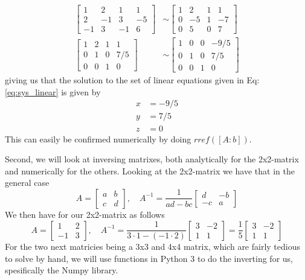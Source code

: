 \documentclass[10pt, a4paper]{amsart}
\begin{document}
\begin{align}
 \left[
 \begin{array}{ccc|c}
 1 & 2 & 1 & 1 \\
 2 & -1 & 3 & -5\\
-1 & 3 & -1 & 6
 \end{array}
 \right] &\sim
 \left[
 \begin{array}{ccc|c}
 1 & 2 & 1 & 1 \\
 0 & -5 & 1 & -7\\
0 & 5 & 0 & 7
 \end{array}
 \right]\\
 \left[
 \begin{array}{ccc|c}
 1 & 2 & 1 & 1 \\
 0 & 1 & 0 & 7/5\\
0 & 0 & 1 & 0
 \end{array}
 \right] &\sim 
 \left[
 \begin{array}{ccc|c}
 1 & 0 & 0 & -9/5 \\
 0 & 1 & 0 & 7/5\\
0 & 0 & 1 & 0
 \end{array}
 \right]
 \end{align}
 giving us that the solution to the set of linear equations given in Eq: \ref{eq:sys_linear} is given by 
 \begin{align*}
  x &= -9/5\\
  y &= 7/5\\
  z &= 0
 \end{align*}
 This can easily be confirmed numerically by doing $rref([A : b])$. 
 
 Second, we will look at inversing matrixes, both analytically for the 2x2-matrix and numerically for the others. Looking at the 2x2-matrix we have that in the general case 
 \begin{equation*}
 	A = 
 	\begin{bmatrix}
 		a & b\\
 		c & d	
 	\end{bmatrix}, \quad A^{-1} = \frac{1}{ad-bc}
 	\begin{bmatrix}
 	d & -b\\
 	-c & a
 	\end{bmatrix}
 \end{equation*}
 We then have for our 2x2-matrix as follows
 \begin{equation}
 A = 
 \begin{bmatrix}
 1 & 2 \\
 -1 & 3
 \end{bmatrix}, \quad A^{-1} = \frac{1}{3\cdot 1 - (-1\cdot 2)}
 \begin{bmatrix}
 3 & -2 \\
 1 & 1
 \end{bmatrix}
 = \frac{1}{5}
 \begin{bmatrix}
 	3 & -2 \\
 	1 & 1
 \end{bmatrix}
 \end{equation}
 For the two next matricies being a 3x3 and 4x4 matrix, which are fairly tedious to solve by hand, we will use functions in Python 3 to do the inverting for us, spesifically the Numpy library. 
 
\end{document}
